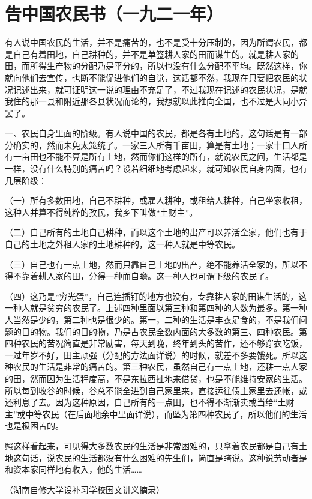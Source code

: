 \section{告中国农民书（一九二一年）}


有人说中国农民的生活，并不是痛苦的，也不是受十分压制的，因为所谓农民，都是自己有着田地，自己耕种的，并不是单签耕人家的田而谋生的。就是耕人家的田，而所得生产物的分配乃是平分的，所以也没有什么分配不平均。既然这样，你就向他们去宣传，也断不能促进他们的自觉，这话都不然，我现在只要把农民的状况记述出来，就可证明这一说的理由不充足了，不过我现在记述的农民状况，是就我住的那一县和附近那各县状况而论的，我想就以此推向全国，也不过是大同小异罢了。

一、农民自身里面的阶级。有人说中国的农民，都是各有土地的，这句话是有一部分确实的，然而未免太笼统了。一家三人所有千亩田，算是有土地；一家十口人所有一亩田也不能不算是所有土地，然而你们这样的所有，就说农民之间，生活都是一样，没有什么特别的痛苦吗？设若细细地考虑起来，就可知农民自身内面，也有几层阶级：

（一）所有多数田地，自己不耕种，或雇人耕种，或租给人耕种，自己坐家收租，这种人并算不得纯粹的孜民，我乡下叫做“土财主”。

（二）自己所有的土地自己耕种，而以这个土地的出产可以养活全家，他们也有于自己的土地之外租人家的土地耕种的，这一种人就是中等农民。

（三）自己也有一点土地，然而只靠自己土地的出产，绝不能养活全家的，所以不得不靠着耕人家的田，分得一种而自瞻。这一种人也可谓下级的农民了。

（四）这乃是“穷光蛋”，自己连插钉的地方也没有，专靠耕人家的田谋生活的，这一种人就是贫穷的农民了。上述四种里面以第三种和第四种的人数为最多。第一种人当然是少的，第二种也是很少的。第一，二种的生活是丰衣足食的，不是我们问题的目的物。我们的目的物，乃是占农民全数内面的大多数的第三、四种农民。第四种农民的苦况简直是非常励害，每天到晚，终年到头的苦作，还不够穿衣吃饭，一过年岁不好，田主顽强（分配的方法面详说）的时候，就差不多要饿死。所以这种农民的生活是非常的痛苦的。第三种农民，虽然自己有一点土地，还耕一点人家的田，然而因为生活程度高，不是东拉西扯地来借贷，也是不能维持安家的生活。所以每到收谷的时候，谷总不能全进到自己家里来，直接运往债主家里去还帐，或还利息了去。因为这种原因，自己所有的一点田，也不得不渐渐卖或当给“土财主”或中等农民（在后面地余中里面详说），而坠为第四种农民了，所以他们的生活也是极困苦的。

照这样看起来，可见得大多数农民的生活是非常困难的，只拿着农民都是自己有土地这句话，说农民的生活都没有什么困难的先生们，简直是瞎说。这种说劳动者是和资本家同样地有收入，他的生活……

\begin{flushright}（湖南自修大学设补习学校国文讲义摘录）\end{flushright}

